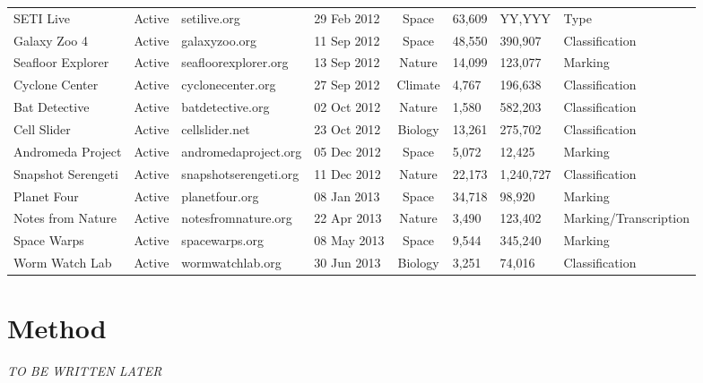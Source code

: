 \documentclass{sigchi}
\begin{document}
\begin{table*}
\begin{center}
\begin{tabular}{lcllclll}
\hline
SETI Live & Active & setilive.org & 29 Feb 2012 & Space & 63,609 & YY,YYY & Type \\
Galaxy Zoo 4 & Active & galaxyzoo.org & 11 Sep 2012 & Space & 48,550 & 390,907 & Classification \\
Seafloor Explorer & Active & seafloorexplorer.org & 13 Sep 2012 & Nature & 14,099 & 123,077 & Marking \\
Cyclone Center & Active & cyclonecenter.org & 27 Sep 2012 & Climate & 4,767 & 196,638 & Classification \\
Bat Detective & Active & batdetective.org & 02 Oct 2012 & Nature & 1,580 & 582,203 & Classification \\
Cell Slider & Active & cellslider.net & 23 Oct 2012 & Biology & 13,261 & 275,702 & Classification \\
Andromeda Project & Active & andromedaproject.org & 05 Dec 2012 & Space & 5,072 & 12,425 & Marking \\
Snapshot Serengeti & Active & snapshotserengeti.org & 11 Dec 2012 & Nature & 22,173 & 1,240,727 & Classification \\
\hline
Planet Four & Active & planetfour.org & 08 Jan 2013 & Space & 34,718 & 98,920 & Marking \\
Notes from Nature & Active & notesfromnature.org & 22 Apr 2013 & Nature & 3,490 & 123,402 & Marking/Transcription \\
Space Warps & Active & spacewarps.org & 08 May 2013 & Space & 9,544 & 345,240 & Marking \\
Worm Watch Lab & Active & wormwatchlab.org & 30 Jun 2013 & Biology & 3,251 & 74,016 & Classification \\
\hline
\end{tabular}
\end{center}
\label{project-summary}
\end{table*}




\section{Method}
\emph{TO BE WRITTEN LATER}
\end{document}
